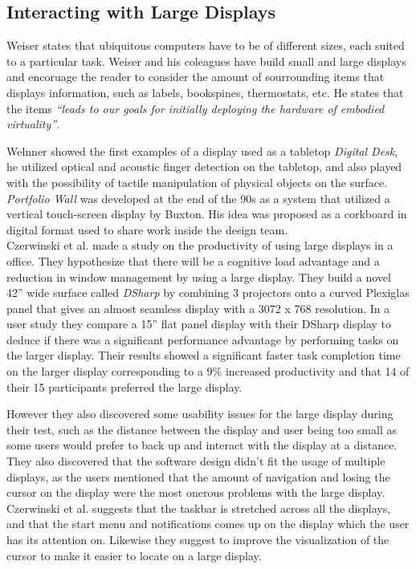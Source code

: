 \subsection{Interacting with Large Displays}
Weiser states that ubiquitous computers have to be of different sizes, each suited to a particular task. Weiser and his coleagues have build small and large displays and encoruage the reader to consider the amount of sourrounding items that displays information, such as labels, bookspines, thermostats, etc. He states that the items \emph{``leads to our goals for initially deploying the hardware of embodied virtuality''}.\cite{Weiser:1991} 

Welnner showed the first examples of a display used as a tabletop \emph{Digital Desk}, he utilized optical and acoustic finger detection on the tabletop, and also played with the possibility of tactile manipulation of physical objects on the surface.\cite{Wellner:1993} \emph{Portfolio Wall} was developed at the end of the 90s as a system that utilized a vertical touch-screen display by Buxton\cite{Buxton:2000}. His idea was proposed as a corkboard in digital format used to share work inside the design team.\\ %

Czerwinski et al. made a study on the productivity of using large displays in a office. They hypothesize that there will be a cognitive load advantage and a reduction in window management by using a large display. They build a novel 42'' wide surface called \emph{DSharp} by combining 3 projectors onto a curved Plexiglas panel that gives an almost seamless display with a 3072 x 768 resolution. In a user study they compare a 15'' flat panel display with their DSharp display to deduce if there was a significant performance advantage by performing tasks on the larger display. Their results showed a significant faster task completion time on the larger display corresponding to a 9\% increased productivity and that 14 of their 15 participants preferred the large display.

However they also discovered some usability issues for the large display during their test, such as the distance between the display and user being too small as some users would prefer to back up and interact with the display at a distance. They also discovered that the software design didn't fit the usage of multiple displays, as the users mentioned that the amount of navigation and losing the cursor on the display were the most onerous problems with the large display.
Czerwinski et al. suggests that the taskbar is stretched across all the displays, and that the start menu and notifications comes up on the display which the user has its attention on. Likewise they suggest to improve the  visualization of the cursor to make it easier to locate on a large display.


